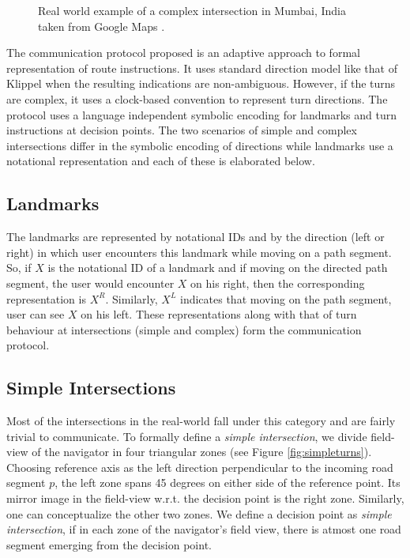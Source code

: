 \documentclass{iitkthesis}
\begin{document}
 \begin{figure}[htb]
\centering
\caption{Real world example of a complex intersection in Mumbai, India taken from Google Maps \cite{gmaps}.}
\label{fig:complex_real}
 \end{figure}


The communication protocol proposed is an adaptive approach to formal representation of route instructions. It uses standard direction model like that of Klippel \cite{klippel} when the resulting indications are non-ambiguous. However, if the turns are complex, it uses a clock-based convention to represent turn directions. The protocol uses a language independent symbolic encoding for landmarks and turn instructions at decision points. The two scenarios of simple and complex intersections differ in the symbolic encoding of directions while landmarks use a notational representation and each of these is elaborated below. 

\subsection{Landmarks}
The landmarks are represented by notational IDs and by the direction (left or right) in which user encounters this landmark while moving on a path segment. So, if $X$ is the notational ID of a landmark and if moving on the directed path segment, the user would encounter $X$ on his right, then the corresponding representation is $X^R$. Similarly, $X^L$ indicates that moving on the path segment, user can see $X$ on his left. These representations along with that of turn behaviour at intersections (simple and complex) form the communication protocol. 

\subsection{Simple Intersections}
Most of the intersections in the real-world fall under this category and are fairly trivial to communicate. To formally define a \textit{simple intersection}, we divide field-view of the navigator in four triangular zones (see Figure \ref{fig:simpleturns}). Choosing reference axis as the left direction perpendicular to the incoming road segment $p$, the left zone spans 45 degrees on either side of the reference point. Its mirror image in the field-view w.r.t. the decision point is the right zone. Similarly, one can conceptualize the other two zones. We define a decision point as \textit{simple intersection}, if in each zone of the navigator's field view, there is atmost one road segment emerging from the decision point. 
\end{document}
